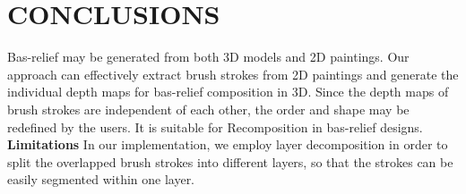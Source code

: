 \chapter{CONCLUSIONS }

Bas-relief may be generated from both 3D models and 2D paintings. Our approach can effectively extract brush strokes from 2D paintings and generate the individual depth maps for bas-relief composition in 3D. Since the depth maps of brush strokes are independent of each other, the order and shape may be redefined by the users. It is suitable for Recomposition in bas-relief designs.\\
\textbf{Limitations} In our implementation, we employ layer decomposition in order to split the overlapped brush strokes into different layers, so that the strokes can be easily segmented within one layer.  
